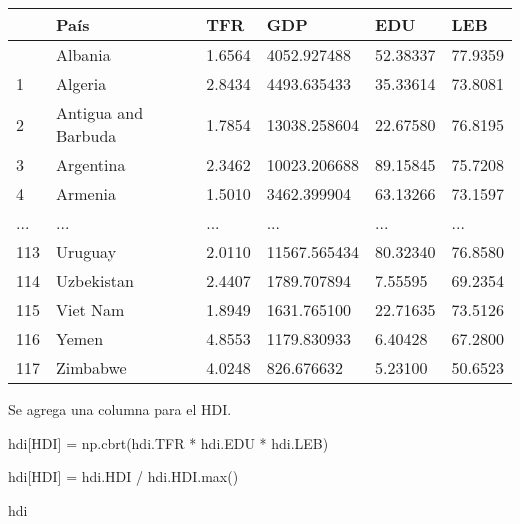 \documentclass[
  letterpaper,
  DIV=11,
  numbers=noendperiod]{scrreprt}
\newenvironment{Shaded}{\begin{snugshade}}{\end{snugshade}}
\newcommand{\BuiltInTok}[1]{\textcolor[rgb]{0.00,0.23,0.31}{#1}}
\newcommand{\NormalTok}[1]{\textcolor[rgb]{0.00,0.23,0.31}{#1}}
\newcommand{\OperatorTok}[1]{\textcolor[rgb]{0.37,0.37,0.37}{#1}}
\newcommand{\StringTok}[1]{\textcolor[rgb]{0.13,0.47,0.30}{#1}}
\begin{document}
\begin{longtable}[]{@{}llllll@{}}
\toprule\noalign{}
& País & TFR & GDP & EDU & LEB \\
\midrule\noalign{}
\endhead
\bottomrule\noalign{}
\endlastfoot
0 & Albania & 1.6564 & 4052.927488 & 52.38337 & 77.9359 \\
1 & Algeria & 2.8434 & 4493.635433 & 35.33614 & 73.8081 \\
2 & Antigua and Barbuda & 1.7854 & 13038.258604 & 22.67580 & 76.8195 \\
3 & Argentina & 2.3462 & 10023.206688 & 89.15845 & 75.7208 \\
4 & Armenia & 1.5010 & 3462.399904 & 63.13266 & 73.1597 \\
... & ... & ... & ... & ... & ... \\
113 & Uruguay & 2.0110 & 11567.565434 & 80.32340 & 76.8580 \\
114 & Uzbekistan & 2.4407 & 1789.707894 & 7.55595 & 69.2354 \\
115 & Viet Nam & 1.8949 & 1631.765100 & 22.71635 & 73.5126 \\
116 & Yemen & 4.8553 & 1179.830933 & 6.40428 & 67.2800 \\
117 & Zimbabwe & 4.0248 & 826.676632 & 5.23100 & 50.6523 \\
\end{longtable}

Se agrega una columna para el HDI.

\begin{Shaded}
\begin{Highlighting}[]
\NormalTok{hdi[}\StringTok{\textquotesingle{}HDI\textquotesingle{}}\NormalTok{] }\OperatorTok{=}\NormalTok{ np.cbrt(hdi.TFR }\OperatorTok{*}\NormalTok{ hdi.EDU }\OperatorTok{*}\NormalTok{ hdi.LEB)}
\end{Highlighting}
\end{Shaded}

\begin{Shaded}
\begin{Highlighting}[]
\NormalTok{hdi[}\StringTok{\textquotesingle{}HDI\textquotesingle{}}\NormalTok{] }\OperatorTok{=}\NormalTok{ hdi.HDI }\OperatorTok{/}\NormalTok{ hdi.HDI.}\BuiltInTok{max}\NormalTok{()}
\end{Highlighting}
\end{Shaded}

\begin{Shaded}
\begin{Highlighting}[]
\NormalTok{hdi}
\end{Highlighting}
\end{Shaded}
\end{document}
